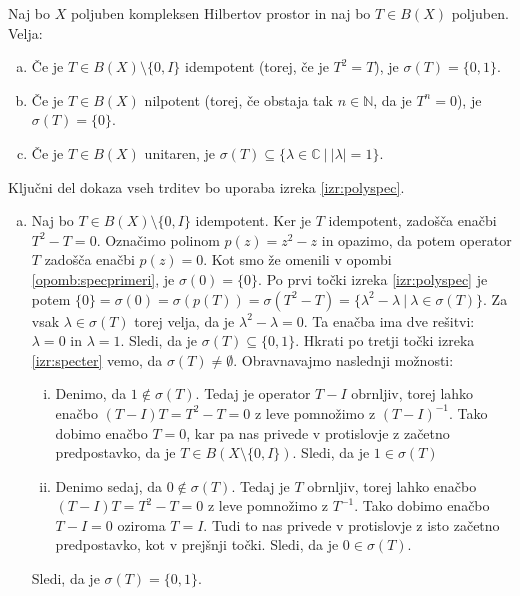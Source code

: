 \documentclass[mat2]{matdelo}
\newcommand{\N}{\mathbb{N}}
\newcommand{\C}{\mathbb{C}}
\newcommand{\abs}[1]{\ensuremath{\lvert #1 \rvert}}
\begin{document}
		\begin{lema}
			\label{lem:idenilunispec}
			Naj bo $X$ poljuben kompleksen Hilbertov prostor in naj bo $T\in B(X)$ poljuben. Velja: \begin{enumerate}[a)]
				\item Če je $T\in B(X)\setminus\{0, I\}$ idempotent (torej, če je $T^2 = T$), je $\sigma(T) = \{0, 1\}$.
				\item Če je $T\in B(X)$ nilpotent (torej, če obstaja tak $n\in \N$, da je $T^n = 0$), je $\sigma(T) = \{0\}$.
				\item Če je $T\in B(X)$ unitaren, je $\sigma(T) \subseteq \{\lambda\in\C~|~ \abs{\lambda}=1\}$.
			\end{enumerate}
		\end{lema}
		
		\begin{dokaz}
			Ključni del dokaza vseh trditev bo uporaba izreka \ref{izr:polyspec}.\begin{enumerate}[a)]
				\item Naj bo $T\in B(X)\setminus\{0, I\}$ idempotent. Ker je $T$ idempotent, zadošča enačbi $T^2 - T = 0$. Označimo polinom $p(z) = z^2 - z$ in opazimo, da potem operator $T$ zadošča enačbi $p(z) = 0$. Kot smo že omenili v opombi \ref{opomb:specprimeri}, je $\sigma(0) = \{0\}$. Po prvi točki izreka \ref{izr:polyspec} je potem $\{0\}=\sigma(0)=\sigma(p(T))=\sigma(T^2 - T) = \{\lambda^2 - \lambda~|~\lambda\in\sigma(T)\}$. Za vsak $\lambda\in\sigma(T)$ torej velja, da je $\lambda^2 - \lambda = 0$. Ta enačba ima dve rešitvi: $\lambda=0$ in $\lambda=1$. Sledi, da je $\sigma(T)\subseteq\{0, 1\}$. Hkrati po tretji točki izreka \ref{izr:specter} vemo, da $\sigma(T)\neq\emptyset$.
				Obravnavajmo naslednji možnosti: \begin{enumerate}[i)]
					\item Denimo, da $1\notin\sigma(T)$. Tedaj je operator $T- I$ obrnljiv, torej lahko enačbo $(T-I)T = T^2 - T = 0$ z leve pomnožimo z $(T-I)^{-1}$. Tako dobimo enačbo $T = 0$, kar pa nas privede v protislovje z začetno predpostavko, da je $T\in B(X\setminus\{0, I\})$. Sledi, da je $1\in\sigma(T)$
					\item Denimo sedaj, da $0\notin\sigma(T)$. Tedaj je $T$ obrnljiv, torej lahko enačbo $(T-I)T = T^2 - T = 0$ z leve pomnožimo z $T^{-1}$. Tako dobimo enačbo $T-I = 0$ oziroma $T=I$. Tudi to nas privede v protislovje z isto začetno predpostavko, kot v prejšnji točki. Sledi, da je $0\in\sigma(T)$.
				\end{enumerate}
				Sledi, da je $\sigma(T) = \{0, 1\}$.

\end{enumerate}
\end{dokaz}
\end{document}
